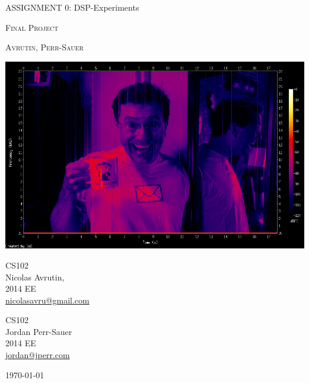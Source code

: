 \documentclass[12pt,letterpaper]{article}
\begin{document}
\begin{titlepage}

\begin{center}

{\LARGE ASSIGNMENT 0: DSP-Experiments}
\vspace{.5 cm}

\textsc{\Large Final Project}
\vspace{1 cm}

\textsc{\Huge Avrutin, Perr-Sauer}
\vspace{.5 cm}

\includegraphics[scale=0.4]{../outputs/cpu_grayscale_sox.png}

\end{center}
\vfill

\begin{flushright}
\begin{large}
CS102 \\
Nicolas Avrutin, \\
2014 EE \\
\url{nicolasavru@gmail.com} \\
\vspace{.5 cm}

CS102 \\
Jordan Perr-Sauer \\
2014 EE \\
\url{jordan@jperr.com}
\vspace{.5 in}

\today

\end{large}
\end{flushright}
\end{titlepage}

\vspace{1in}
\doublespacing
\end{document}
